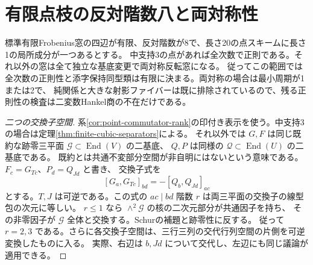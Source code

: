 \section{有限点枝の反対階数八と両対称性}
\label{sec:rank-eight-finite-symmetry}
\begin{theorem}\label{thm:rank-eight-finite-symmetry}
標準有限Frobenius窓の四辺が有限、反対階数が8で、長さ20の点スキームに長さ1の局所成分が一つあるとする。
中支持3の点があれば全次数で正則である。それ以外の窓は全て独立な基底変更で両対称反転窓になる。
従ってこの範囲では全次数の正則性と添字保持同型類は有限に決まる。両対称の場合は最小周期が1または2で、
純関係と大きな射影ファイバーは既に排除されているので、残る正則性の検査は二変数Hankel商の不在だけである。
\end{theorem}
\begin{proof}[二つの交換子空間]
系\ref{cor:point-commutator-rank}の印付き表示を使う。中支持3の場合は定理\ref{thm:finite-cubic-separators}による。
それ以外では $G,F$ は同じ既約な跡零三平面 $\mathcal G\subset\operatorname{End}(V)$ の二基底、
$Q,P$ は同様の $\mathcal Q\subset\operatorname{End}(U)$ の二基底である。
既約とは共通不変部分空間が非自明にはないという意味である。$F_c=G_{Tc}$、$P_d=Q_{Jd}$ と書き、
交換子式を
\[
 [G_a,G_{Tc}]_{bd}=-[Q_b,Q_{Jd}]_{ac}
\]
とする。$T,J$ は可逆である。この式の $ac\mid bd$ 階数 $r$ は両三平面の交換子の線型包の次元に等しい。
$r\le1$ なら $\wedge^2\mathcal G$ の核の二次元部分が共通因子を持ち、
その非零因子が $\mathcal G$ 全体と交換する。Schurの補題と跡零性に反する。
従って $r=2,3$ である。さらに各交換子空間は、三行三列の交代行列空間の片側を可逆変換したものに入る。
実際、右辺は $b,Jd$ について交代し、左辺にも同じ議論が適用できる。
\end{proof}

